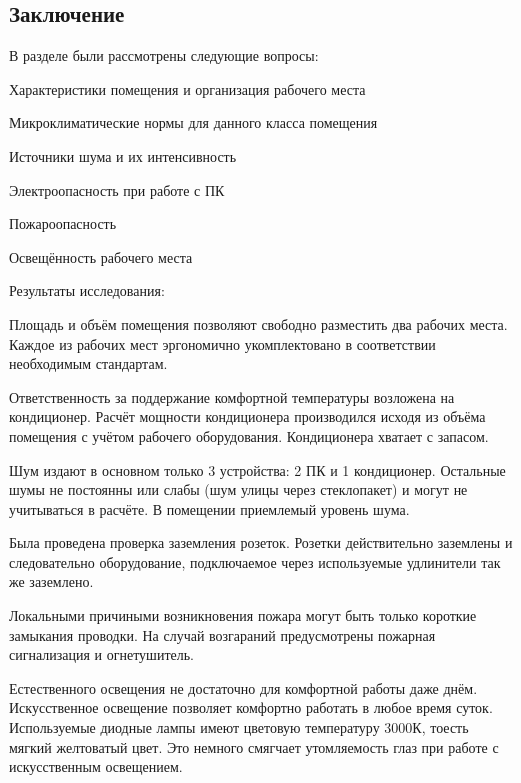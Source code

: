 \subsection{Заключение}

В разделе были рассмотрены следующие вопросы: 
\begin{mintemize}
\item Характеристики помещения и организация рабочего места
\item Микроклиматические нормы для данного класса помещения
\item Источники шума и их интенсивность
\item Электроопасность при работе с ПК
\item Пожароопасность
\item Освещённость рабочего места
\end{mintemize}

Результаты исследования: 
\begin{mintemize}
\item Площадь и объём помещения позволяют свободно разместить два
    рабочих места. Каждое из рабочих мест эргономично укомплектовано
    в соответствии необходимым стандартам.
\item Ответственность за поддержание комфортной температуры возложена на
    кондиционер. Расчёт мощности кондиционера производился исходя из
    объёма помещения с учётом рабочего оборудования. Кондиционера хватает
    с запасом.
\item Шум издают в основном только 3 устройства: 2 ПК и 1 кондиционер.
    Остальные шумы не постоянны или слабы (шум улицы через стеклопакет)
    и могут не учитываться в расчёте. В помещении приемлемый уровень шума.
\item Была проведена проверка заземления розеток. Розетки действительно
    заземлены и следовательно оборудование, подключаемое через используемые
    удлинители так же заземлено.
\item Локальными причиными возникновения пожара могут быть только короткие
    замыкания проводки. На случай возгараний предусмотрены пожарная сигнализация
    и огнетушитель.
\item Естественного освещения не достаточно для комфортной работы даже днём.
    Искусственное освещение позволяет комфортно работать в любое время суток.
    Используемые диодные лампы имеют цветовую температуру 3000К, тоесть мягкий
    желтоватый цвет. Это немного смягчает утомляемость глаз при работе с
    искусственным освещением.
\end{mintemize}
